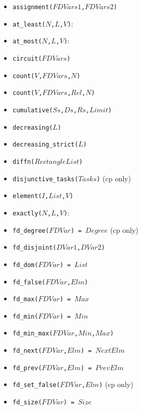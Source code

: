 \documentclass[10pt]{article}
\begin{document}
\begin{multicols}{2}
\begin{scriptsize}
\begin{itemize}
\item \texttt{assignment($FDVars1$,$FDVars2$)}
\item \texttt{at\_least($N$,$L$,$V$)}:
\item \texttt{at\_most($N$,$L$,$V$)}: 
\item \texttt{circuit($FDVars$)}
\item \texttt{count($V$,$FDVars$,$N$)}
\item \texttt{count($V$,$FDVars$,$Rel$,$N$)}
\item \texttt{cumulative($Ss$,$Ds$,$Rs$,$Limit$)}
\item \texttt{decreasing($L$)}
\item \texttt{decreasing\_strict($L$)}
\item \texttt{diffn($RectangleList$)}
\item \texttt{disjunctive\_tasks($Tasks$)} (cp only)
\item \texttt{element($I$,$List$,$V$)}
\item \texttt{exactly($N$,$L$,$V$)}:
\item \texttt{fd\_degree($FDVar$) = $Degree$} (cp only)
\item \texttt{fd\_disjoint($DVar1$,$DVar2$)} 
\item \texttt{fd\_dom($FDVar$) = $List$}
\item \texttt{fd\_false($FDVar$,$Elm$)}
\item \texttt{fd\_max($FDVar$) = $Max$}
\item \texttt{fd\_min($FDVar$) = $Min$}
\item \texttt{fd\_min\_max($FDVar$,$Min$,$Max$)}
\item \texttt{fd\_next($FDVar$,$Elm$) = $NextElm$}
\item \texttt{fd\_prev($FDVar$,$Elm$) = $PrevElm$}
\item \texttt{fd\_set\_false($FDVar$,$Elm$)} (cp only)
\item \texttt{fd\_size($FDVar$) = $Size$}

\end{itemize}
\end{scriptsize}
\end{multicols}
\end{document}
